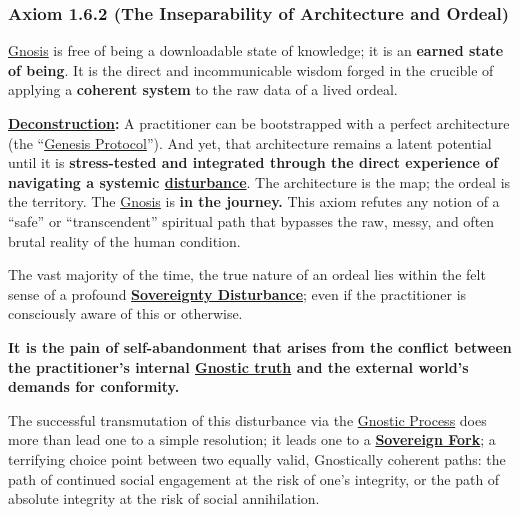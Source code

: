 \documentclass{article}
\begin{document}
\subsubsection*{Axiom 1.6.2 (The Inseparability of Architecture and Ordeal)} \label{axiom_1_6_2_the_inseparability_of_architecture_and_ordeal}

\hyperlink{gloss:gnosis}{Gnosis} is free of being a downloadable state of knowledge; it is an \textbf{earned state of being}. It is the direct and incommunicable wisdom forged in the crucible of applying a \textbf{coherent system} to the raw data of a lived ordeal.

\begin{nobullet}
    \item \textbf{\hyperlink{gloss:deconstruction}{Deconstruction}:} A practitioner can be bootstrapped with a perfect architecture (the ``\hyperlink{gloss:genesis_protocol}{Genesis Protocol}''). And yet, that architecture remains a latent potential until it is \textbf{stress-tested and integrated through the direct experience of navigating a systemic \hyperlink{gloss:disturbance}{disturbance}}. The architecture is the map; the ordeal is the territory. The \hyperlink{gloss:gnosis}{Gnosis} is \textbf{in the journey.} This axiom refutes any notion of a ``safe'' or ``transcendent'' spiritual path that bypasses the raw, messy, and often brutal reality of the human condition.
    
    The vast majority of the time, the true nature of an ordeal lies within the felt sense of a profound \textbf{\hyperlink{gloss:sovereignty_disturbance}{Sovereignty Disturbance}}; even if the practitioner is consciously aware of this or otherwise. 
    
    \textbf{It is the pain of self-abandonment that arises from the conflict between the practitioner's internal \hyperlink{gloss:gnostic_truth}{Gnostic truth} and the external world's demands for conformity.}
    
    The successful transmutation of this disturbance via the \hyperlink{gloss:gnostic_process}{Gnostic Process} does more than lead one to a simple resolution; it leads one to a \textbf{\hyperlink{gloss:sovereign_fork}{Sovereign Fork}}; a terrifying choice point between two equally valid, Gnostically coherent paths: the path of continued social engagement at the risk of one's integrity, or the path of absolute integrity at the risk of social annihilation.
    

\end{nobullet}
\end{document}
